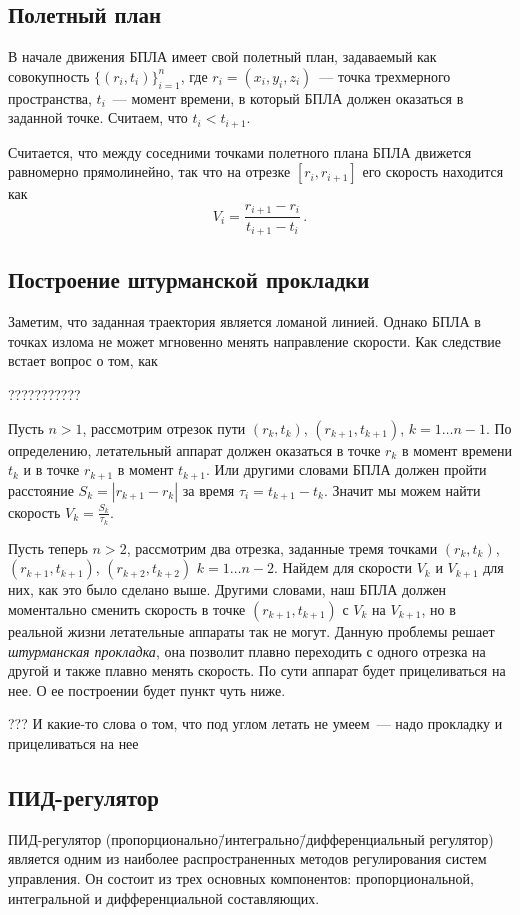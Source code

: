 \documentclass[a4paper,12pt]{article}
\begin{document}
\subsection{Полетный план}

В начале движения БПЛА имеет свой полетный план, задаваемый как совокупность $\{(r_i, t_i)\}_{i=1}^n$, где $r_i=(x_i,y_i,z_i)$~--- точка трехмерного пространства, $t_i$~--- момент времени, в который БПЛА должен оказаться в заданной точке. Считаем, что $t_i < t_{i+1}$.

Считается, что между соседними точками полетного плана БПЛА движется равномерно прямолинейно, так что на отрезке $[r_i,r_{i+1}]$ его скорость находится как
$$
  V_i = \frac{r_{i+1} - r_i}{t_{i+1} - t_i}\,.
$$

\subsection{Построение штурманской прокладки}

Заметим, что заданная траектория является ломаной линией. Однако БПЛА в точках излома не может мгновенно менять направление скорости. Как следствие встает вопрос о том, как 

???????????

Пусть $n>1$, рассмотрим отрезок пути $(r_k,t_k)$, $(r_{k+1},t_{k+1})$, $k=1\dots n-1$. По определению, летательный аппарат должен оказаться в точке $r_k$ в момент времени $t_k$ и в точке $r_{k+1}$ в момент $t_{k+1}$. Или другими словами БПЛА должен пройти расстояние $S_k= |r_{k+1} - r_{k}|$ за время $\tau_i = t_{k+1} - t_{k}$. Значит мы можем найти скорость $V_k = \frac{S_k}{\tau_k}$.

Пусть теперь $n>2$, рассмотрим два отрезка, заданные тремя точками $(r_k,t_k)$, $(r_{k+1},t_{k+1})$, $(r_{k+2},t_{k+2})$ $k=1\dots n-2$. Найдем для скорости $V_k$ и $V_{k+1}$ для них, как это было сделано выше. Другими словами, наш БПЛА должен моментально сменить скорость в точке $(r_{k+1},t_{k+1})$ с $V_k$ на $V_{k+1}$, но в реальной жизни летательные аппараты так не могут. Данную проблемы решает \textit{штурманская прокладка}, она позволит плавно переходить с одного отрезка на другой и также плавно менять скорость. По сути аппарат будет прицеливаться на нее. О ее построении будет пункт чуть ниже.

???
И какие-то слова о том, что под углом летать не умеем~--- надо прокладку и прицеливаться на нее

\subsection{ПИД-регулятор}
ПИД-регулятор (пропорционально\=/интегрально\=/дифференциальный регулятор) является одним из наиболее распространенных методов регулирования систем управления. Он состоит из трех основных компонентов: пропорциональной, интегральной и дифференциальной составляющих.
\end{document}
